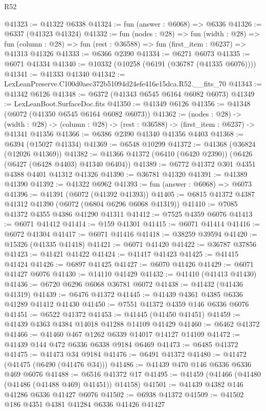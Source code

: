 \begin{lexlean}{R52}
\begin{coremodule}
@41323 := @41322 @6338
@41324 := fun (answer : @6068) => @6336
@41326 := @6337 (@41323 @41324)
@41332 := fun (nodes : @28) =>
  fun (width : @28) =>
  fun (column : @28) => fun (rest : @36588) => fun (first_item : @6237) => @41313 @41326
@41333 := @6366 @2390
@41334 := @6271 @6073
@41335 := @6071 @41334
@41340 := @10332 (@10258 (@6191 (@36787 (@41335 @6076))))
@41341 := @41333 @41340
@41342 := LexLeanPreserve.C100d0aec372b51094d24efe416e15dca.R52.__fits_70
@41343 := @41342 @6126
@41348 := @6372 (@41343 @6545 @6164 @6082 @6073)
@41349 := LexLeanBoot.SurfaceDoc.fits
@41350 := @41349 @6126
@41356 := @41348 (@6072 (@41350 @6545 @6164 @6082 @6073))
@41362 := (nodes : @28) ->
  (width : @28) -> (column : @28) -> (rest : @36588) -> (first_item : @6237) -> @41341 @41356
@41366 := @6386 @2390 @41340 @41356 @4403
@41368 := @6394 (@15027 @41334)
@41369 := @6548 @10299
@41372 := @41368 (@36824 (@12026 @41369))
@41382 := @41366 @41372 (@6410 (@6420 @2390)) (@6426 (@6427 (@6428 @4403) @41340 @6404))
@41389 := @6772 @41372 @301 @4351 @4388 @4401 @41312 @41326
@41390 := @36781 @41320
@41391 := @41389 @41390
@41392 := @41322 @6962
@41393 := fun (answer : @6068) => @6073
@41396 := @41391 (@6072 (@41392 @41393))
@41405 := @6815 @41372 @4387 @41312 @41390 (@6072 (@6804 @6296 @6068 @41319))
@41410 := @7085 @41372 @4355 @4386 @41290 @41311
@41412 := @7525 @4359 @6076
@41413 := @6071 @41412
@41414 := @159 @41301
@41415 := @6071 @41414
@41416 := @6072 @41304
@41417 := @6071 @41416
@41418 := @38259 @39594
@41420 := @15326 (@41335 @41418)
@41421 := @6071 @41420
@41422 := @36787 @37856
@41423 := @41421 @41422
@41424 := @41417 @41423
@41425 := @41415 @41424
@41426 := @6897 @41425
@41427 := @6070 @41426
@41429 := @6071 @41427 @6076
@41430 := @14110 @41429
@41432 := @41410 (@41413 @41430)
@41436 := @6720 @6296 @6068 @36781 @6072
@41438 := @41432 (@41436 @41319)
@41439 := @6476 @41372
@41445 := @41439 @4361 @4385 @6336 @41289 @41412 @41430
@41450 := @7551 @41372 @4359 @146 @6336 @6076
@41451 := @6522 @41372
@41453 := @41445 (@41450 @41451)
@41459 := @41439 @4363 @4384 @14018 @41288 @14109 @41429
@41460 := @6462 @41372
@41466 := @41460 @467 @1262 @6339 @14017 @14127 @14109
@41472 := @41439 @144 @472 @6336 @6338 @9184 @6469
@41473 := @6485 @41372
@41475 := @41473 @34 @9184
@41476 := @6491 @41372
@41480 := @41472 (@41475 (@6490 (@41476 @34)))
@41486 := @41439 @470 @146 @6336 @6336 @469 @6076
@41488 := @6516 @41372 @17
@41495 := @41459 (@41466 (@41480 (@41486 (@41488 @469) @41451)) @14158)
@41501 := @41439 @4382 @146 @41286 @6336 @41427 @6076
@41502 := @6938 @41372
@41509 := @41502 @186 @4351 @4381 @41284 @6336 @41426 @41427

\end{coremodule}
\end{lexlean}

